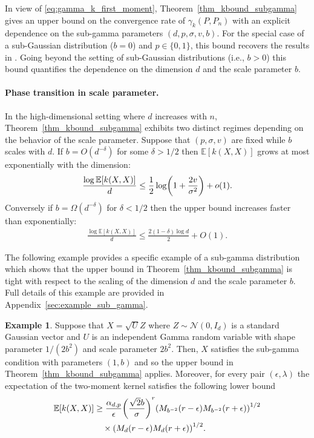 \documentclass{article}
\theoremstyle{definition}
\newtheorem{example}{Example}
\newcommand{\bEx}{\ensuremath{\mathbb{E}}}
\newcommand{\ex}[1]{\ensuremath{\mathbb{E}\left[ #1\right]}}
\newcommand{\normal}{\mathcal{N}}
\newcommand{\eps}{\epsilon}
\newcommand{\appname}{Appendix}
\newcommand{\appname}{Supplement}
\let\originalleft\left
\let\originalright\right
\renewcommand{\left}{\mathopen{}\mathclose\bgroup\originalleft}
\renewcommand{\right}{\aftergroup\egroup\originalright}
\begin{document}
In view of  \eqref{eq:gamma_k_first_moment},  Theorem~\ref{thm_kbound_subgamma} gives an upper bound on the convergence rate of $\gamma_k(P,P_n)$ with an explicit dependence on the sub-gamma parameters $(d,p,\sigma,v,b)$. 
For the special case of a sub-Gaussian distribution ($b =0$) and $p \in \{0,1\}$, this bound recovers the results 
in \cite{goldfeld:2020}. Going beyond the setting of sub-Gaussian distributions (i.e., $b > 0$) this bound quantifies the dependence on the dimension $d$ and the scale parameter $b$. 


\paragraph{Phase transition in scale parameter.}
In the high-dimensional setting where $d$ increases with $n$, Theorem~\ref{thm_kbound_subgamma}  exhibits two distinct regimes depending on the behavior of the scale parameter. Suppose that $(p, \sigma, v)$ are fixed while $b$ scales with $d$.  If $b = O( d^{- \delta})$ for some  $\delta  > 1/2$  then $\bEx[k(X,X)]$ grows at most exponentially with the dimension:
\begin{align}
 \frac{\log  \bEx[k(X,X)]}{d}  \le  \frac{1}{2}\log\left( 1 +  \frac{2v}{\sigma^2} \right) + o(1).
\end{align}
Conversely if $b = \Omega(d^{-\delta})$  for $\delta <1/2$ then the upper bound increases faster than exponentially:
\begin{align*}
  \frac{ \log \bEx[k(X,X)]}{ d  } \le  \frac{2 (1 - \delta)  \log d}{2}  + O(1) .
\end{align*}

The following example provides a specific example of a sub-gamma distribution which shows that the upper bound in  Theorem~\ref{thm_kbound_subgamma} is tight with respect to the scaling of the dimension $d$ and the scale parameter $b$. Full details of this example are provided in \appname~\ref{sec:example_sub_gamma}.

\begin{example}\label{eg:1}
Suppose that $X = \sqrt{U}Z$ where $Z \sim \normal(0, I_d)$ is a standard Gaussian vector and $U$ is an independent Gamma random variable with shape parameter $1/(2 b^2)$ and scale parameter $2 b^2$. Then, $X$ satisfies the sub-gamma condition with parameters $(1,b)$ and so the upper bound in Theorem~\ref{thm_kbound_subgamma} applies. Moreover, for every pair $(\eps,\lambda)$ the expectation of the two-moment kernel satisfies the following lower bound 
\begin{align}
\ex{k(X,X)} &\ge \frac{ \alpha_{d,p}  }{\eps } \left(\frac{\sqrt{2} b}{\sigma} \right)^{r} \left( M_{b^{-2}}(r - \eps)M_{b^{-2}}(r + \eps)\right)^{1/2} \notag\\
& \quad \times\left( M_{d}(r - \eps)M_{d}(r + \eps)\right)^{1/2}. \label{eq_kxx_example_LB}
\end{align}
\end{example}
\end{document}
